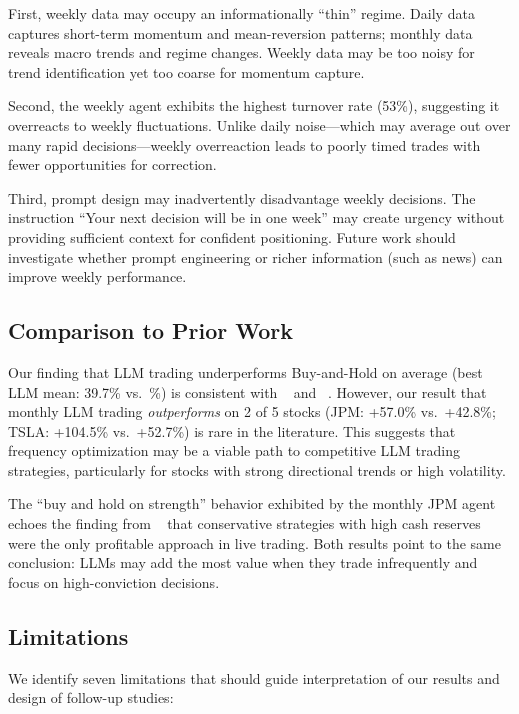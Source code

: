 First, weekly data may occupy an informationally ``thin'' regime. Daily data captures short-term momentum and mean-reversion patterns; monthly data reveals macro trends and regime changes. Weekly data may be too noisy for trend identification yet too coarse for momentum capture.

Second, the weekly agent exhibits the highest turnover rate (53\%), suggesting it overreacts to weekly fluctuations. Unlike daily noise---which may average out over many rapid decisions---weekly overreaction leads to poorly timed trades with fewer opportunities for correction.

Third, prompt design may inadvertently disadvantage weekly decisions. The instruction ``Your next decision will be in one week'' may create urgency without providing sufficient context for confident positioning. Future work should investigate whether prompt engineering or richer information (such as news) can improve weekly performance.

\subsection{Comparison to Prior Work}

Our finding that LLM trading underperforms Buy-and-Hold on average (best LLM mean: 39.7\% vs.\ \%) is consistent with \finsaber~\citep{li2026finsaber} and \deepfund~\citep{deepfund2025}. However, our result that monthly LLM trading \emph{outperforms} \bh on 2 of 5 stocks (JPM: +57.0\% vs.\ +42.8\%; TSLA: +104.5\% vs.\ +52.7\%) is rare in the literature. This suggests that frequency optimization may be a viable path to competitive LLM trading strategies, particularly for stocks with strong directional trends or high volatility.

The ``buy and hold on strength'' behavior exhibited by the monthly JPM agent echoes the finding from \deepfund~\citep{deepfund2025} that conservative strategies with high cash reserves were the only profitable approach in live trading. Both results point to the same conclusion: LLMs may add the most value when they trade infrequently and focus on high-conviction decisions.

\subsection{Limitations}
\label{sec:limitations}

We identify seven limitations that should guide interpretation of our results and design of follow-up studies:

